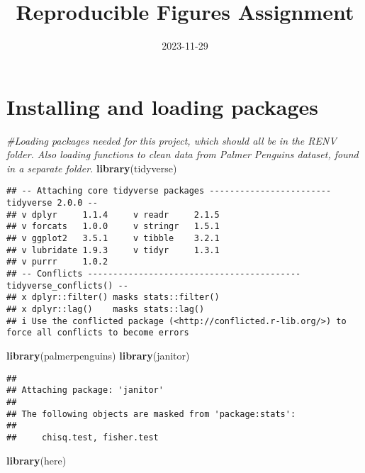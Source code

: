 \documentclass[
]{article}
\title{Reproducible Figures Assignment}
\author{}
\date{\vspace{-2.5em}2023-11-29}
\newenvironment{Shaded}{\begin{snugshade}}{\end{snugshade}}
\newcommand{\CommentTok}[1]{\textcolor[rgb]{0.56,0.35,0.01}{\textit{#1}}}
\newcommand{\FunctionTok}[1]{\textcolor[rgb]{0.13,0.29,0.53}{\textbf{#1}}}
\newcommand{\NormalTok}[1]{#1}
\begin{document}
\maketitle

\section{Installing and loading
packages}\label{installing-and-loading-packages}

\begin{Shaded}
\begin{Highlighting}[]
\CommentTok{\#Loading packages needed for this project, which should all be in the RENV folder. Also loading functions to clean data from Palmer Penguins dataset, found in a separate folder.}
\FunctionTok{library}\NormalTok{(tidyverse)}
\end{Highlighting}
\end{Shaded}

\begin{verbatim}
## -- Attaching core tidyverse packages ------------------------ tidyverse 2.0.0 --
## v dplyr     1.1.4     v readr     2.1.5
## v forcats   1.0.0     v stringr   1.5.1
## v ggplot2   3.5.1     v tibble    3.2.1
## v lubridate 1.9.3     v tidyr     1.3.1
## v purrr     1.0.2     
## -- Conflicts ------------------------------------------ tidyverse_conflicts() --
## x dplyr::filter() masks stats::filter()
## x dplyr::lag()    masks stats::lag()
## i Use the conflicted package (<http://conflicted.r-lib.org/>) to force all conflicts to become errors
\end{verbatim}

\begin{Shaded}
\begin{Highlighting}[]
\FunctionTok{library}\NormalTok{(palmerpenguins)}
\FunctionTok{library}\NormalTok{(janitor)}
\end{Highlighting}
\end{Shaded}

\begin{verbatim}
## 
## Attaching package: 'janitor'
## 
## The following objects are masked from 'package:stats':
## 
##     chisq.test, fisher.test
\end{verbatim}

\begin{Shaded}
\begin{Highlighting}[]
\FunctionTok{library}\NormalTok{(here)}
\end{Highlighting}
\end{Shaded}
\end{document}
